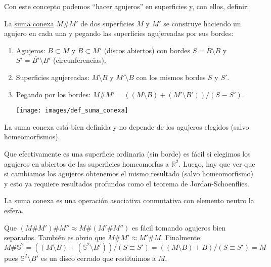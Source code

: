 Con este concepto podemos ``hacer agujeros'' en superficies y, con ellos, definir:
\begin{defi}
La \underline{suma conexa} $M \# M'$ de dos superficies $M$ y $M'$ se construye haciendo un agujero en cada una y pegando las superficies agujereadas por sus bordes:
\begin{enumerate}
    \item Agujeros: $B \subset M$ y $B \subset M'$ (discos abiertos) con bordes $S = \overline{B} \setminus B$ y $S' = \overline{B'} \setminus B'$ (circunferencias).
    \item Superficies agujereadas: $M\setminus B$ y $M'\setminus B$ con los mismos bordes $S$ y $S'$.
    \item Pegando por los bordes: $M \# M' = \left( \left( M \setminus B \right) + \left( M' \setminus B' \right) \right) / \left( S \equiv S' \right)$.
    \begin{center}
        \texttt{[image: images/def\_suma\_conexa]} 
    \end{center}
\end{enumerate}
\end{defi}

\begin{prop}
La suma conexa está bien definida y no depende de los agujeros elegidos (salvo homeomorfismos).
\end{prop}
\begin{demo}
Que efectivamente es una superficie ordinaria (sin borde) es fácil si elegimos los agujeros en abiertos de las superficies homeomorfas a $\mathbb{R}^{2}$. Luego, hay que ver que si cambiamos los agujeros obtenemos el mismo resultado (salvo homeomorfismo) y esto ya requiere resultados profundos como el teorema de Jordan-Schoenflies.
\end{demo}

\begin{prop}
La suma conexa es una operación asociativa conmutativa con elemento neutro la esfera.
\end{prop}
\begin{demo}
Que $\left( M \# M' \right) \# M'' \approx M \# \left( M' \# M'' \right)$ es fácil tomando agujeros bien separados. También es obvio que $M \# M' \approx M' \# M$. Finalmente:
\[
M \# \mathbb{S}^{2} = \left( \left( M \setminus B \right) + \left( \mathbb{S}^{2} \setminus B' \right) \right) / \left( S \equiv S' \right) = \left( \left( M \setminus B \right) + B \right) / \left( S \equiv S' \right) = M
\]
pues $\mathbb{S}^{2} \setminus B'$ es un disco cerrado que restituimos a $M$.
\end{demo}

